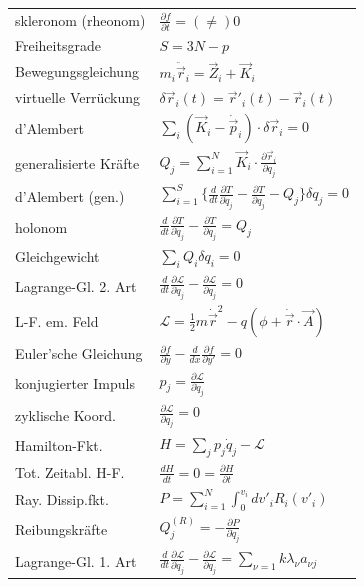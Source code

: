 \documentclass[12pt,a4paper]{article}
\renewcommand{\d}[2]{\frac{d #1}{d #2}}
\newcommand{\pd}[2]{\frac{\partial #1}{\partial #2}}
\renewcommand{\=}[1]{\stackrel{#1}{=}}
\theoremstyle{definition}
\theoremstyle{remark}
\begin{document}
\begin{center}
\begin{minipage}[t]{.6\linewidth}
\vspace{0pt}
\begin{tabular}{ll}
skleronom (rheonom) & $\pd{f}{t} = (\neq) 0$\\
Freiheitsgrade & $S = 3N - p$\\
Bewegungsgleichung & $m_i \ddot{\vec{r}}_i = \vec{Z}_i + \vec{K}_i$\\
virtuelle Verrückung &  $\delta \vec{r}_i(t) = \vec{r}'_i(t) - \vec{r}_i(t)$\\
d'Alembert & $\sum_i (\vec{K}_i - \dot{\vec{p}}_i) \cdot \delta \vec{r}_i = 0$\\
generalisierte Kräfte & $Q_j = \sum_{i = 1}^N \vec{K}_i \cdot \pd{\vec{r}_i}{q_j}$\\
d'Alembert (gen.) & $\sum_{i = 1}^S \Big\{ \d{}{t} \pd{T}{\dot{q}_j} - \pd{T}{q_j} - Q_j \Big\} \delta q_j = 0$\\
holonom & $\d{}{t} \pd{T}{\dot{q}_j} - \pd{T}{q_j} = Q_j$\\
Gleichgewicht & $\sum_i Q_i \delta q_i = 0$\\
Lagrange-Gl. 2. Art & $\d{}{t} \pd{\mathscr{L}}{\dot{q}_j} - \pd{\mathscr{L}}{q_j} = 0$\\
L-F. em. Feld &  $\mathscr{L} = \frac{1}{2}m \dot{\vec{r}}^2 - q (\phi + \dot{\vec{r}} \cdot \vec{A})$\\
Euler'sche Gleichung & $\pd{f}{y} - \d{}{x}\pd{f}{y'} = 0$\\
konjugierter Impuls & $p_j = \pd{\mathscr{L}}{\dot{q}_j}$\\
zyklische Koord. & $\pd{\mathscr{L}}{q_j} = 0$\\
Hamilton-Fkt. & $H = \sum_j p_j \dot{q}_j - \mathscr{L}$\\
Tot. Zeitabl. H-F. & $\d{H}{t} = 0 = \pd{H}{t}$\\
Ray. Dissip.fkt. & $P = \sum_{i=1}^N \int_0^{v_i} dv'_i R_i(v'_i)$\\
Reibungskräfte & $Q_j^{(R)} = -\pd{P}{\dot{q}_j}$\\
Lagrange-Gl. 1. Art & $\d{}{t} \pd{\mathscr{L}}{\dot{q}_j} - \pd{\mathscr{L}}{q_j} = \sum_{\nu = 1}{k} \lambda_{\nu} a_{\nu j}$\\
\end{tabular}
\end{minipage}%
\begin{minipage}[t]{.4\linewidth}
\vspace{0pt}


\end{minipage}
\end{center}
\end{document}
